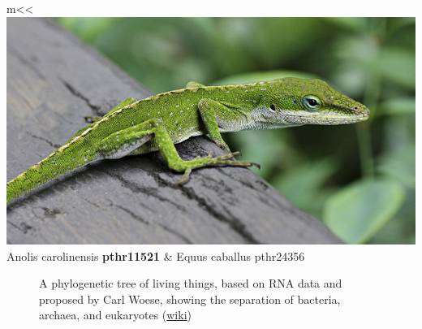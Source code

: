 \documentclass[aspectratio=169, 9pt]{beamer}\usepackage[]{graphicx}\usepackage[]{color}
\begin{document}
\begin{frame}[t]
\begin{table}
\begin{tabular}{*{2}{m{\tmpwidth}<\centering}}
\includegraphics[width=1\linewidth]{Anole_Lizard.jpg} \linebreak Anolis carolinensis \textbf{pthr11521} & %
   \linebreak Equus caballus pthr24356
\end{tabular}
\end{table}

\vfill \hfill \hyperlink{geneontology}{}

\end{frame}

\begin{frame}

\begin{figure}
\centering
{\footnotesize
\def\svgwidth{.7\linewidth}

}
\caption{A phylogenetic tree of living things, based on RNA data and proposed by Carl Woese, showing the separation of bacteria, archaea, and eukaryotes (\href{https://en.wikipedia.org/wiki/File:Phylogenetic_tree.svg}{wiki})}
\end{figure}
\end{frame}
\end{document}

